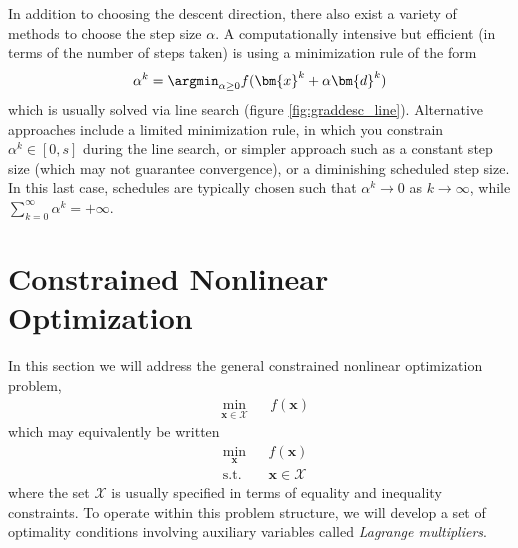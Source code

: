 In addition to choosing the descent direction, there also exist a variety of methods to choose the step size $\alpha$. A computationally intensive but efficient (in terms of the number of steps taken) is using a minimization rule of the form 
\begin{equation}
\alpha^k = \argmin_{\alpha\geq 0} f(\bm{x}^k + \alpha \bm{d}^k)  
\end{equation}
which is usually solved via line search (figure \ref{fig:graddesc_line}). Alternative approaches include a limited minimization rule, in which you constrain $\alpha^k \in [0,s]$ during the line search, or simpler approach such as a constant step size (which may not guarantee convergence), or a diminishing scheduled step size. In this last case, schedules are typically chosen such that $\alpha^k \to 0$ as $k \to \infty$, while $\sum_{k=0}^\infty \alpha^k = +\infty$. 


\section{Constrained Nonlinear Optimization}

In this section we will address the general constrained nonlinear optimization problem,
\begin{equation*}
\begin{aligned}
& \underset{\bm{x} \in \mathcal{X}}{\min}
& & f(\bm{x})
\end{aligned}
\end{equation*}
which may equivalently be written
\begin{equation*}
\begin{aligned}
& \underset{\bm{x}}{\min}
& & f(\bm{x})\\
& \textrm{s.t.} & & \bm{x} \in \mathcal{X}
\end{aligned}
\end{equation*}
where the set $\mathcal{X}$ is usually specified in terms of equality and inequality constraints. To operate within this problem structure, we will develop a set of optimality conditions involving auxiliary variables called \textit{Lagrange multipliers}. 

